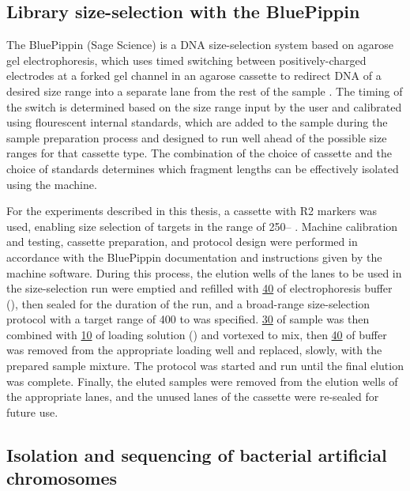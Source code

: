 \subsection{Library size-selection with the BluePippin}
\label{sec:methods_molec_standard_bluepippin}

The BluePippin (Sage Science) is a DNA size-selection system based on agarose gel electrophoresis, which uses timed switching between positively-charged electrodes at a forked gel channel in an agarose cassette to redirect DNA of a desired size range into a separate lane from the rest of the sample \parencite{sage2016bluepippin}. The timing of the switch is determined based on the size range input by the user and calibrated using flourescent internal standards, which are added to the sample during the sample preparation process and designed to run well ahead of the possible size ranges for that cassette type. The combination of the choice of cassette and the choice of standards determines which fragment lengths can be effectively isolated using the machine.

For the experiments described in this thesis, a  cassette with R2 markers was used, enabling size selection of targets in the range of 250-- \parencite{sage2016bluepippin}. Machine calibration and testing, cassette preparation, and protocol design were performed in accordance with the BluePippin documentation and instructions given by the machine software. During this process, the elution wells of the lanes to be used in the size-selection run were emptied and refilled with \ul{40} of electrophoresis buffer (), then sealed for the duration of the run, and a broad-range size-selection protocol with a target range of 400 to  was specified. \ul{30} of sample was then combined with \ul{10} of loading solution () and vortexed to mix, then \ul{40} of buffer was removed from the appropriate loading well and replaced, slowly, with the prepared sample mixture. The protocol was started and run until the final elution was complete. Finally, the eluted samples were removed from the elution wells of the appropriate lanes, and the unused lanes of the cassette were re-sealed for future use.

\subsection{Isolation and sequencing of bacterial artificial chromosomes}
\label{sec:methods_molec_bacs}


